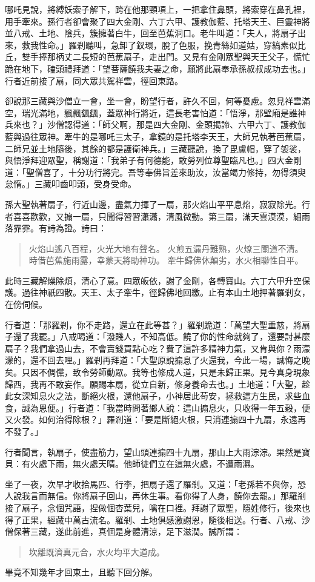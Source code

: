 哪吒見說，將縛妖索子解下，跨在他那頸項上，一把拿住鼻頭，將索穿在鼻孔裡，用手牽來。孫行者卻會聚了四大金剛、六丁六甲、護教伽藍、托塔天王、巨靈神將並八戒、土地、陰兵，簇擁著白牛，回至芭蕉洞口。老牛叫道：「夫人，將扇子出來，救我性命。」羅剎聽叫，急卸了釵環，脫了色服，挽青絲如道姑，穿縞素似比丘，雙手捧那柄丈二長短的芭蕉扇子，走出門。又見有金剛眾聖與天王父子，慌忙跪在地下，磕頭禮拜道：「望菩薩饒我夫妻之命，願將此扇奉承孫叔叔成功去也。」行者近前接了扇，同大眾共駕祥雲，徑回東路。

卻說那三藏與沙僧立一會，坐一會，盼望行者，許久不回，何等憂慮。忽見祥雲滿空，瑞光滿地，飄飄颻颻，蓋眾神行將近，這長老害怕道：「悟淨，那壁廂是誰神兵來也？」沙僧認得道：「師父啊，那是四大金剛、金頭揭諦、六甲六丁、護教伽藍與過往眾神。牽牛的是哪吒三太子，拿鏡的是托塔李天王，大師兄執著芭蕉扇，二師兄並土地隨後，其餘的都是護衛神兵。」三藏聽說，換了毘盧帽，穿了袈裟，與悟淨拜迎眾聖，稱謝道：「我弟子有何德能，敢勞列位尊聖臨凡也。」四大金剛道：「聖僧喜了，十分功行將完。吾等奉佛旨差來助汝，汝當竭力修持，勿得須臾怠惰。」三藏叩齒叩頭，受身受命。

孫大聖執著扇子，行近山邊，盡氣力揮了一扇，那火焰山平平息焰，寂寂除光。行者喜喜歡歡，又搧一扇，只聞得習習瀟瀟，清風微動。第三扇，滿天雲漠漠，細雨落霏霏。有詩為證。詩曰：
\begin{quote}
火焰山遙八百程，火光大地有聲名。
火煎五漏丹難熟，火燎三關道不清。
時借芭蕉施雨露，幸蒙天將助神功。
牽牛歸佛休顛劣，水火相聯性自平。
\end{quote}

此時三藏解燥除煩，清心了意。四眾皈依，謝了金剛，各轉寶山。六丁六甲升空保護。過往神祇四散。天王、太子牽牛，徑歸佛地回繳。止有本山土地押著羅剎女，在傍伺候。

行者道：「那羅剎，你不走路，還立在此等甚？」羅剎跪道：「萬望大聖垂慈，將扇子還了我罷。」八戒喝道：「潑賤人，不知高低。饒了你的性命就夠了，還要討甚麼扇子？我們拿過山去，不會賣錢買點心吃？費了這許多精神力氣，又肯與你？雨濛濛的，還不回去哩。」羅剎再拜道：「大聖原說搧息了火還我，今此一場，誠悔之晚矣。只因不倜儻，致令勞師動眾。我等也修成人道，只是未歸正果。見今真身現象歸西，我再不敢妄作。願賜本扇，從立自新，修身養命去也。」土地道：「大聖，趁此女深知息火之法，斷絕火根，還他扇子，小神居此苟安，拯救這方生民，求些血食，誠為恩便。」行者道：「我當時問著鄉人說：這山搧息火，只收得一年五穀，便又火發。如何治得除根？」羅剎道：「要是斷絕火根，只消連搧四十九扇，永遠再不發了。」

行者聞言，執扇子，使盡筋力，望山頭連搧四十九扇，那山上大雨淙淙。果然是寶貝：有火處下雨，無火處天晴。他師徒們立在這無火處，不遭雨濕。

坐了一夜，次早才收拾馬匹、行李，把扇子還了羅剎。又道：「老孫若不與你，恐人說我言而無信。你將扇子回山，再休生事。看你得了人身，饒你去罷。」那羅剎接了扇子，念個咒語，捏做個杏葉兒，噙在口裡。拜謝了眾聖，隱姓修行，後來也得了正果，經藏中萬古流名。羅剎、土地俱感激謝恩，隨後相送。行者、八戒、沙僧保著三藏，遂此前進，真個是身體清涼，足下滋潤。誠所謂：
\begin{quote}
坎離既濟真元合，水火均平大道成。
\end{quote}

畢竟不知幾年才回東土，且聽下回分解。
